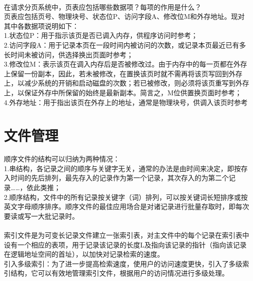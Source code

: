 \documentclass[UTF8]{article}
\begin{document}
    \\
    在请求分页系统中，页表应包括哪些数据项？每项的作用是什么？\\
    页表应包括页号、物理块号、状态位P、访问字段A、修改位M和外存地址。现对其中各数据项说明如下：\\
    1.状态位P：用于指示该页是否已调入内存，供程序访问时参考；\\
    2.访问字段A：用于记录本页在一段时间内被访问的次数，或记录本页最近已有多长时间未被访问，供选择换出页面时参考；\\
    3.修改位M：表示该页在调入内存后是否被修改过。由于内存中的每一页都在外存上保留一份副本，因此，若未被修改，在置换该页时就不需再将该页写回到外存上，以减少系统的开销和启动磁盘的次数；若已被修改，则必须将该页重写到外存上，以保证外存中所保留的始终是最新副本。简言之，M位供置换页面时参考；\\
    4.外存地址：用于指出该页在外存上的地址，通常是物理块号，供调入该页时参考\\
    \section*{文件管理}
    顺序文件的结构可以归纳为两种情况：\\
    1.串结构，各记录之间的顺序与关键字无关，通常的办法是由时间来决定，即按存入时间的先后排列，最先存入的记录作为第一个记录，其次存入的为第二个记录……，依此类推；\\
    2.顺序结构，文件中的所有记录按关键字（词）排列，可以按关键词长短排序或按英文字母顺序排序。顺序文件的最佳应用场合是对诸记录进行批量存取时，即每次要读或写一大批记录时。\\
    \\
    索引文件是为可变长记录文件建立一张索引表，对主文件中的每个记录在索引表中设有一个相应的表项，用于记录该记录的长度L及指向该记录的指针（指向该记录在逻辑地址空间的首址），以加快对记录检索的速度。\\
    引入多级索引：为了进一步提高检索速度，使用户的访问速度更快，引入了多级索引结构，它可以有效地管理索引文件，根据用户的访问情况进行多级处理。\\
    \\
    
\end{document}
